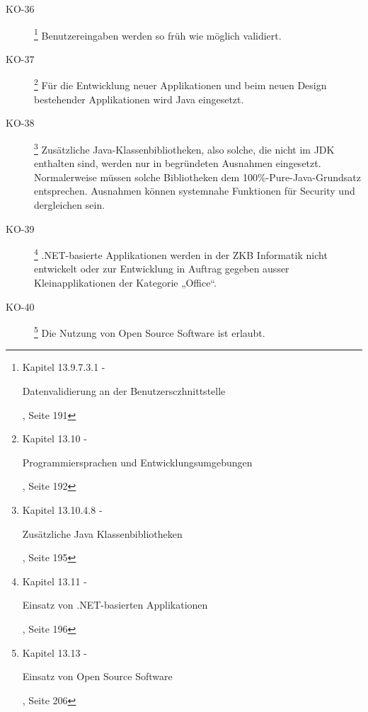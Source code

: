 \documentclass[
11pt, %
a4paper, %
BCOR25mm, %
DIV14, %
footsepline = false, %
headsepline, %
twoside, %
openright,
abstracton, %
listof=totocnumbered, %
bibliography=totocnumbered %
]{scrreprt}
\begin{document}
\begin{description}
    \item[KO-36\label{itm:KO-36}]
    \footnote{\cite{ZkbHandbuchDerItArchitektur} Kapitel 13.9.7.3.1 -
    \begin{itshape}Datenvalidierung an der Benutzersczhnittstelle\end{itshape},
    Seite 191}
    Benutzereingaben werden so früh wie möglich validiert.
    
    \item[KO-37\label{itm:KO-37}]
    \footnote{\cite{ZkbHandbuchDerItArchitektur} Kapitel 13.10 -
    \begin{itshape}Programmiersprachen und Entwicklungsumgebungen\end{itshape},
    Seite 192}
    Für die Entwicklung neuer Applikationen und beim neuen Design bestehender
    Applikationen wird Java eingesetzt.
    
    \item[KO-38\label{itm:KO-38}]
    \footnote{\cite{ZkbHandbuchDerItArchitektur} Kapitel 13.10.4.8 -
    \begin{itshape}Zusätzliche Java Klassenbibliotheken\end{itshape}, Seite 195}
    Zusätzliche Java-Klassenbibliotheken, also solche, die nicht im JDK
    enthalten sind, werden nur in begründeten Ausnahmen eingesetzt.
    Normalerweise müssen solche Bibliotheken dem 100\%-Pure-Java-Grundsatz
    entsprechen. Ausnahmen können systemnahe Funktionen für Security und
    dergleichen sein.
    
    \item[KO-39\label{itm:KO-39}]
    \footnote{\cite{ZkbHandbuchDerItArchitektur} Kapitel 13.11 -
    \begin{itshape}Einsatz von .NET-basierten Applikationen\end{itshape}, Seite
    196}
    .NET-basierte Applikationen werden in der ZKB Informatik nicht entwickelt
    oder zur Entwicklung in Auftrag gegeben ausser Kleinapplikationen der
    Kategorie „Office“.
    
    \item[KO-40\label{itm:KO-40}]
    \footnote{\cite{ZkbHandbuchDerItArchitektur} Kapitel 13.13 -
    \begin{itshape}Einsatz von Open Source Software\end{itshape}, Seite 206}
    Die Nutzung von Open Source Software ist erlaubt.
    

\end{description}
\end{document}
